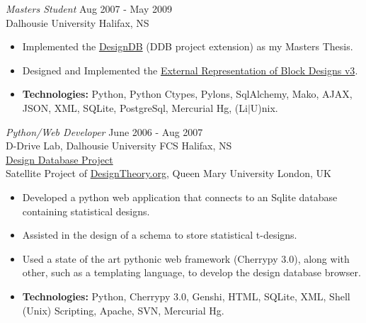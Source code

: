 \documentclass[line,margin]{res}
\begin{document}
\begin{resume}
   {\sl Masters Student} \hfill Aug 2007 - May 2009 \\
     Dalhousie University \hfill Halifax, NS \smallskip
      \begin{itemize}  \itemsep -2pt %
       \item Implemented the
       \href{http://designtheory.org/library/extrep/designdb-1.0.pdf}{DesignDB} (DDB
       project extension) as my Masters Thesis.
       \item Designed and Implemented the
       \href{http://designtheory.org/library/extrep/}{External
       Representation of Block Designs v3}.
       \item {\bf Technologies:} \hspace{1pt}
        Python, Python Ctypes, Pylons, SqlAlchemy, Mako, AJAX, \newline
        \hspace*{72pt} JSON, XML, SQLite, PostgreSql, Mercurial Hg,
        (Li$|$U)nix.
    \end{itemize}

    {\sl Python/Web Developer} \hfill June 2006 - Aug 2007 \\
    D-Drive Lab, Dalhousie University FCS \hfill Halifax, NS \\
    \href{http://web.cs.dal.ca/~peter/designdb/}{Design Database Project}\\
    Satellite Project of \href{http://designtheory.org}{DesignTheory.org},
    Queen Mary University \hfill London, UK \smallskip
        \begin{itemize}  \itemsep -2pt %
    \item Developed a python web application that connects to an Sqlite
    database \\ containing statistical designs.
    \item Assisted in the design of a schema to store statistical t-designs.
    \item Used a state of the art pythonic web framework (Cherrypy 3.0),
    along with other, such as a templating language, to develop the design
    database browser.
    \item {\bf Technologies:} \hspace{1pt}
        Python, Cherrypy 3.0, Genshi, HTML, SQLite, XML, \newline
        \hspace*{72pt} Shell (Unix) Scripting, Apache, SVN, Mercurial Hg.
        \end{itemize}


\end{resume}
\end{document}
